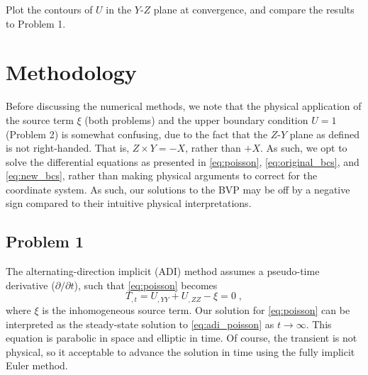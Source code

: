 \documentclass[11pt]{article}
\begin{document}
Plot the contours of $U$ in the $Y$-$Z$ plane at convergence, and compare the results to Problem 1.

\section{Methodology} %

Before discussing the numerical methods, we note that the physical application of the source term $\xi$ (both problems) and the upper boundary condition $U=1$ (Problem 2) is somewhat confusing, due to the fact that the $Z$-$Y$ plane as defined is not right-handed. That is, $Z \times Y = -X$, rather than $+X$. As such, we opt to solve the differential equations as presented in \eqref{eq:poisson}, \eqref{eq:original_bcs}, and \eqref{eq:new_bcs}, rather than making physical arguments to correct for the coordinate system. As such, our solutions to the BVP may be off by a negative sign compared to their intuitive physical interpretations.

\subsection{Problem 1}

The alternating-direction implicit (ADI) method assumes a pseudo-time derivative ($\partial/\partial t$), such that \eqref{eq:poisson} becomes
\begin{equation}
T_{,t} = U_{,YY} + U_{,ZZ} - \xi = 0
\;,
\label{eq:adi_poisson}
\end{equation}
where $\xi$ is the inhomogeneous source term. Our solution for \eqref{eq:poisson} can be interpreted as the steady-state solution to \eqref{eq:adi_poisson} as $t \rightarrow \infty$. This equation is parabolic in space and elliptic in time. Of course, the transient is not physical, so it acceptable to advance the solution in time using the fully implicit Euler method.
\end{document}
